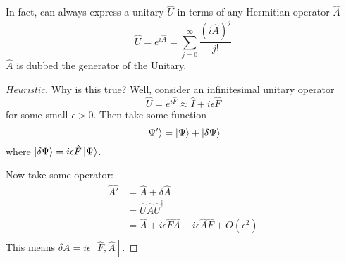 \begin{theorem}
    In fact, can always express a unitary $\hat{U}$ in terms of any Hermitian operator $\hat{A}$
    \[ \hat{U} = e^{i\hat{A}} = \sum_{j = 0}^{\infty} \frac{(i\hat{A})^j}{j!}\]
    $\hat{A}$ is dubbed the generator of the Unitary.
    \begin{proof}[Heuristic]
        Why is this true? Well, consider an infinitesimal unitary operator
    \[ \hat{U} = e^{i\hat{F}} \approx \hat{I} + i \epsilon \hat{F} \]
    for some small $\epsilon > 0$. Then take some function
    \[ \ket{\Psi'} = \ket{\Psi} + \ket{\delta \Psi} \]
    where $\ket{\delta \Psi} = i \epsilon \hat{F} \ket{\Psi}$.

    Now take some operator:
    \begin{align*}
        \hat{A'} &= \hat{A} + \delta\hat{A} \\
        &= \hat{U} \hat{A} \hat{U}^{\dagger} \\
        &= \hat{A} + i \epsilon \hat{F}\hat{A} - i \epsilon \hat{A}\hat{F} + O(\epsilon^2) \\
    \end{align*}
    This means $\delta A = i \epsilon [\hat{F}, \hat{A}]$.
    \end{proof}
\end{theorem}
